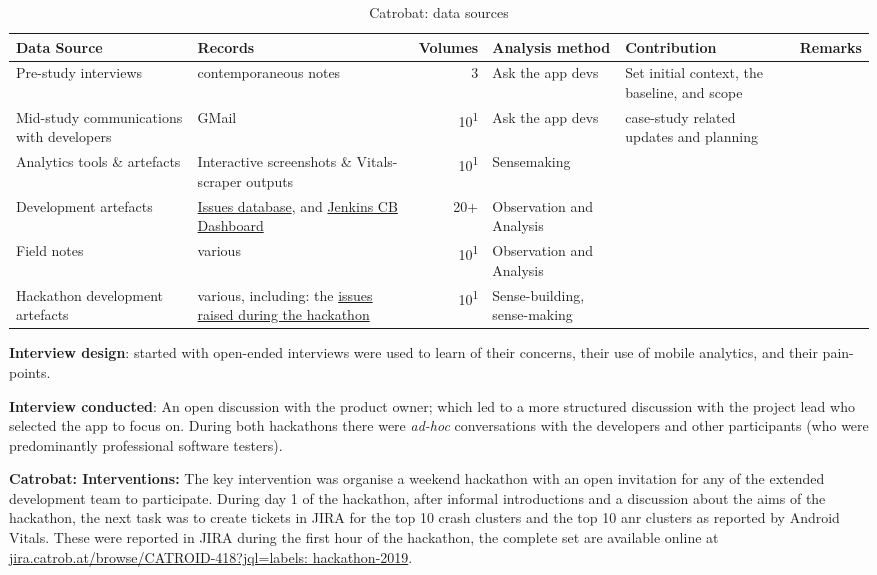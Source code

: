 \begin{table*}
    \centering
    \footnotesize
    \tabcolsep=0.12cm
    \begin{tabular}{p{2.4cm}p{2.4cm}r>{\raggedright}p{2.4cm}>{\raggedright}p{3cm}>{\raggedright\arraybackslash}p{2.5cm}}
        Data Source & Records & Volumes & Analysis method & Contribution & Remarks \\
        \toprule
         Pre-study interviews & contemporaneous notes & 3 & Ask the app devs & Set initial context, the baseline, and scope &  \\
         Mid-study communications with developers & GMail & 10\textsuperscript{1} & Ask the app devs & case-study related updates and planning &  \\
         Analytics tools \& artefacts & Interactive screenshots \& Vitals-scraper outputs &10\textsuperscript{1} & Sensemaking &  &  \\
         Development artefacts & \href{https://jira.catrob.at/}{Issues database}, and \href{https://jenkins.catrob.at/}{Jenkins CB Dashboard} & 20+ & Observation and Analysis & & \\
         Field notes & various & 10\textsuperscript{1} & Observation and Analysis & & \\
         Hackathon development artefacts & various, including: the \href{https://jira.catrob.at/browse/CATROID-418?jql=labels\%20\%3D\%20hackathon-2019}{issues raised during the hackathon} & 10\textsuperscript{1} & Sense-building, sense-making & & \\
         \bottomrule
    \end{tabular}
    \caption{Catrobat: data sources}
    \label{tab:catrobat-data-sources}
\end{table*}


\textbf{Interview design}: started with open-ended interviews were used to learn of their concerns, their use of mobile analytics, and their pain-points.

\textbf{Interview conducted}: An open discussion with the product owner; which led to a more structured discussion with the project lead who selected the app to focus on. During both hackathons there were \emph{ad-hoc} conversations with the developers and other participants (who were predominantly professional software testers).

\textbf{Catrobat: Interventions:} 
The key intervention was organise a weekend hackathon with an open invitation for any of the extended development team to participate.
%
During day 1 of the hackathon, after informal introductions and a discussion about the aims of the hackathon, the next task was to create tickets in JIRA for the top 10 crash clusters and the top 10 \acrshort{anr} clusters as reported by Android Vitals. These were reported in JIRA during the first hour of the hackathon, the complete set are available online at \href{https://jira.catrob.at/browse/CATROID-418?jql=labels\%20\%3D\%20hackathon-2019}{jira.catrob.at/browse/CATROID-418?jql=labels: hackathon-2019}. 

